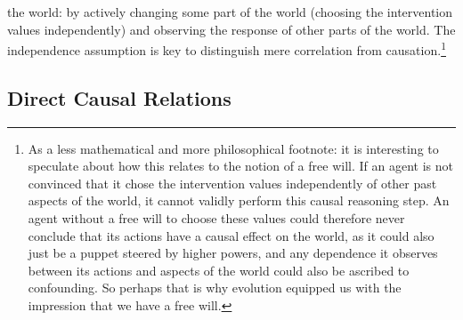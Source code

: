 the world: by actively changing some part of the world (choosing the intervention values independently) and observing
the response of other parts of the world.
The independence assumption is key to distinguish mere correlation from causation.\footnote{As a less mathematical
and more philosophical footnote: it is interesting
to speculate about how this relates to the notion of a free will. 
If an agent is not convinced that it chose the intervention values independently of other past
aspects of the world, it cannot validly perform this causal reasoning step. An agent without a free will
to choose these values could therefore never conclude that its actions have a causal effect on the world,
as it could also just be a puppet steered by higher powers, and any dependence it observes between its actions 
and aspects of the world 
could also be ascribed to confounding. So perhaps that is why evolution equipped us with the impression that we have a free will.}

\subsection{Direct Causal Relations}

